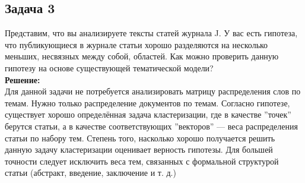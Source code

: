 \documentclass[a4paper, 12pt]{article}
\begin{document}
\subsection*{Задача 3}
Представим, что вы анализируете тексты статей журнала J. У вас есть гипотеза, что публикующиеся в журнале статьи хорошо разделяются на несколько меньших, несвязных между собой, областей. Как можно проверить данную гипотезу на основе существующей тематической модели?\\
\textbf{Решение:}\\
Для данной задачи не потребуется анализировать матрицу распределения слов по темам. Нужно только распределение документов по темам. Согласно гипотезе, существует хорошо определённая задача кластеризации, где в качестве ''точек'' берутся статьи, а в качестве соответствующих ''векторов'' --- веса распределения статьи по набору тем. Степень того, насколько хорошо получается решить данную задачу кластеризации оценивает верность гипотезы. Для большей точности следует исключить веса тем, связанных с формальной структурой статьи (абстракт, введение, заключение и т. д.)
\end{document}
